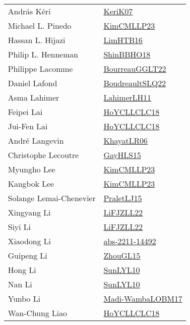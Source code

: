 {\begin{longtable}{p{4cm}p{20cm}}
Andr{\'{a}}s K{\'{e}}ri & \href{papers/KeriK07.pdf}{KeriK07}\cite{KeriK07} \\
Michael L. Pinedo & \href{papers/KimCMLLP23.pdf}{KimCMLLP23}\cite{KimCMLLP23} \\
Hassan L. Hijazi & \href{papers/LimHTB16.pdf}{LimHTB16}\cite{LimHTB16} \\
Philip L. Henneman & \href{articles/ShinBBHO18.pdf}{ShinBBHO18}\cite{ShinBBHO18} \\
Philippe Lacomme & \href{articles/BourreauGGLT22.pdf}{BourreauGGLT22}\cite{BourreauGGLT22} \\
Daniel Lafond & \href{papers/BoudreaultSLQ22.pdf}{BoudreaultSLQ22}\cite{BoudreaultSLQ22} \\
Asma Lahimer & \href{papers/LahimerLH11.pdf}{LahimerLH11}\cite{LahimerLH11} \\
Feipei Lai & \href{papers/HoYCLLCLC18.pdf}{HoYCLLCLC18}\cite{HoYCLLCLC18} \\
Jui{-}Fen Lai & \href{papers/HoYCLLCLC18.pdf}{HoYCLLCLC18}\cite{HoYCLLCLC18} \\
Andr{\'{e}} Langevin & \href{articles/KhayatLR06.pdf}{KhayatLR06}\cite{KhayatLR06} \\
Christophe Lecoutre & \href{papers/GayHLS15.pdf}{GayHLS15}\cite{GayHLS15} \\
Myungho Lee & \href{papers/KimCMLLP23.pdf}{KimCMLLP23}\cite{KimCMLLP23} \\
Kangbok Lee & \href{papers/KimCMLLP23.pdf}{KimCMLLP23}\cite{KimCMLLP23} \\
Solange Lemai{-}Chenevier & \href{papers/PraletLJ15.pdf}{PraletLJ15}\cite{PraletLJ15} \\
Xingyang Li & \href{papers/LiFJZLL22.pdf}{LiFJZLL22}\cite{LiFJZLL22} \\
Siyi Li & \href{papers/LiFJZLL22.pdf}{LiFJZLL22}\cite{LiFJZLL22} \\
Xiaodong Li & \href{articles/abs-2211-14492.pdf}{abs-2211-14492}\cite{abs-2211-14492} \\
Guipeng Li & \href{papers/ZhouGL15.pdf}{ZhouGL15}\cite{ZhouGL15} \\
Hong Li & \href{papers/SunLYL10.pdf}{SunLYL10}\cite{SunLYL10} \\
Nan Li & \href{papers/SunLYL10.pdf}{SunLYL10}\cite{SunLYL10} \\
Yunbo Li & \href{papers/Madi-WambaLOBM17.pdf}{Madi-WambaLOBM17}\cite{Madi-WambaLOBM17} \\
Wan{-}Chung Liao & \href{papers/HoYCLLCLC18.pdf}{HoYCLLCLC18}\cite{HoYCLLCLC18} \\

\end{longtable}}
